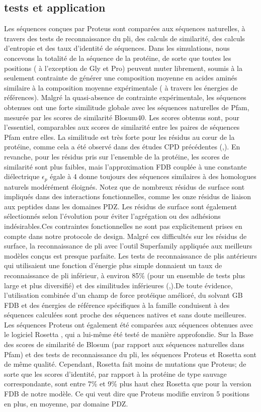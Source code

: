\subsection{tests et application}

Les séquences conçues par Proteus sont comparées aux séquences naturelles, à travers des tests de reconnaissance du pli, des calculs de similarité, des calculs d'entropie et des taux d'identité de séquences. Dans les simulations, nous concevons la totalité de la séquence de la protéine, de sorte que toutes les positions  ( à l'exception de Gly et Pro) peuvent muter librement, soumis à la seulement contrainte de générer une composition moyenne en acides aminés similaire à la composition moyenne expérimentale ( à travers les énergies de références). Malgré la quasi-absence de contrainte expérimentale, les séquences obtenues ont une forte similitude globale avec les séquences naturelles de Pfam, mesurée par les scores de similarité Blosum40. Les scores obtenus sont, pour l'essentiel, comparables aux scores de similarité entre les paires de séquences Pfam entre elles. La similitude est très forte pour les résidus au cœur de la protéine, comme cela a été observé dans des études CPD précédentes (\cite{30},\cite{72}). En revanche, pour les résidus pris sur l'ensemble de la protéine, les scores de similarité sont plus faibles, mais l'approximation FDB couplée à une constante diélectrique $\epsilon_p$ égale à 4 donne toujours des séquences similaires à des homologues naturels modérément éloignés. Notez que de nombreux résidus de surface sont impliqués dans des interactions fonctionnelles, comme les onze résidus de liaison aux peptides dans les domaines PDZ. Les résidus de surface sont également sélectionnés selon l'évolution pour éviter l'agrégation ou des adhésions indésirables.Ces contraintes fonctionnelles ne sont pas explicitement prises en compte dans  notre protocole de design.  Malgré ces difficultés sur les résidus de surface, la reconnaissance de pli avec l'outil Superfamily  appliquée aux meilleurs modèles conçus est presque parfaite. Les tests de reconnaissance de plis antérieurs qui utilisaient une fonction d'énergie plus simple donnaient un taux de reconnaissance de pli inférieur, à environ 85\% (pour un ensemble de tests plus large et plus diversifié) et des similitudes inférieures (\cite{15},\cite{50}).De toute évidence, l'utilisation combinée d'un champ de force protéique amélioré, du solvant GB FDB et des énergies de référence spécifiques à la famille conduisent à des séquences calculées sont proche des séquences natives et sans doute meilleures.
Les séquences Proteus ont également été comparées aux séquences obtenues avec le logiciel Rosetta , qui a lui-même été testé de manière approfondie. Sur la Base des scores de similarité de Blosum (par rapport aux séquences naturelles dans Pfam) et des tests de reconnaissance du pli, les séquences Proteus et Rosetta sont de même qualité. Cependant, Rosetta fait moins de mutations que Proteus; de sorte que les scores d'identité, par rapport à la protéine de type sauvage correspondante, sont entre 7\% et 9\% plus haut chez Rosetta que pour la version FDB de notre modèle. Ce qui veut dire que Proteus modifie environ 5 positions en plus, en moyenne, par domaine PDZ. 



   

